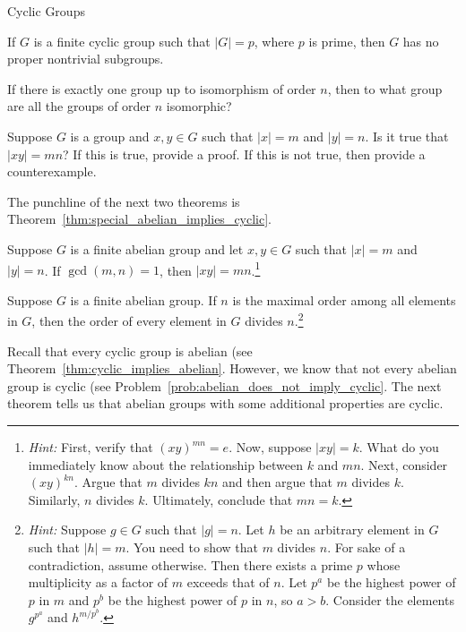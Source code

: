 \begin{section}{Cyclic Groups}
\begin{corollary}
If $G$ is a finite cyclic group such that $|G|=p$, where $p$ is prime, then $G$ has no proper nontrivial subgroups.
\end{corollary}

\begin{problem}
If there is exactly one group up to isomorphism of order $n$, then to what group are all the groups of order $n$ isomorphic?
\end{problem}

\begin{problem}
Suppose $G$ is a group and $x,y\in G$ such that $|x|=m$ and $|y|=n$. Is it true that $|xy|=mn$?  If this is true, provide a proof.  If this is not true, then provide a counterexample.
\end{problem}

The punchline of the next two theorems is Theorem~\ref{thm:special_abelian_implies_cyclic}.

\begin{theorem}
Suppose $G$ is a finite abelian group and let $x,y\in G$ such that $|x|=m$ and $|y|=n$. If $\gcd(m,n)=1$, then $|xy|=mn$.\footnote{\emph{Hint:} First, verify that $(xy)^{mn}=e$. Now, suppose $|xy|=k$. What do you immediately know about the relationship between $k$ and $mn$. Next, consider $(xy)^{kn}$. Argue that $m$ divides $kn$ and then argue that $m$ divides $k$. Similarly, $n$ divides $k$. Ultimately, conclude that $mn=k$.}
\end{theorem}

\begin{theorem}
Suppose $G$ is a finite abelian group. If $n$ is the maximal order among all elements in $G$, then the order of every element in $G$ divides $n$.\footnote{\emph{Hint:} Suppose $g\in G$ such that $|g|=n$. Let $h$ be an arbitrary element in $G$ such that $|h|=m$. You need to show that $m$ divides $n$. For sake of a contradiction, assume otherwise. Then there exists a prime $p$ whose multiplicity as a factor of $m$ exceeds that of $n$. Let $p^a$ be the highest power of $p$ in $m$ and $p^b$ be the highest power of $p$ in $n$, so $a>b$. Consider the elements $g^{p^a}$ and $h^{m/p^b}$.}
\end{theorem}

Recall that every cyclic group is abelian (see Theorem~\ref{thm:cyclic_implies_abelian}.  However, we know that not every abelian group is cyclic (see Problem~\ref{prob:abelian_does_not_imply_cyclic}.  The next theorem tells us that abelian groups with some additional properties are cyclic.


\end{section}
